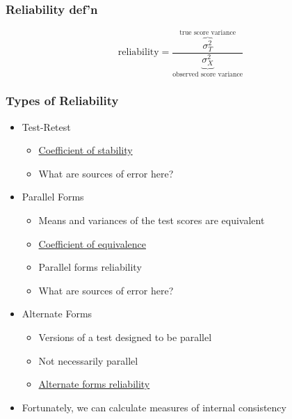 \documentclass[dvipsnames]{beamer}\usepackage[]{graphicx}\usepackage[]{color}
\begin{document}
\begin{frame}
\frametitle{Reliability def'n}
$$\text{reliability} = \frac{\overbrace{\sigma^2_T}^{\text{true score variance}}}{\underbrace{\sigma^2_X}_{\text{observed score variance}}}$$
\end{frame}

\begin{frame}
\frametitle{Types of Reliability}
\begin{itemize}
\item <1->Test-Retest
  \begin{itemize}
    \item<1-> \underline{Coefficient of stability}
    \item <1->What are sources of error here?
  \end{itemize}
\item <2->Parallel Forms
  \begin{itemize}
    \item <2->Means and variances of the test scores are equivalent
    \item <2->\underline{Coefficient of equivalence}
    \item <2->Parallel forms reliability
    \item <2->What are sources of error here?
  \end{itemize}
\item<3-> Alternate Forms 
  \begin{itemize}
    \item<3-> Versions of a test designed to be parallel
    \item<3-> Not necessarily parallel
    \item<3-> \underline{Alternate forms reliability}
  \end{itemize}
\item<4-> Fortunately, we can calculate measures of internal consistency
\end{itemize}
\end{frame}
\end{document}
